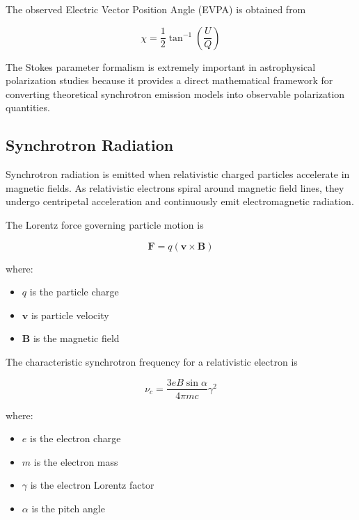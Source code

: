 \documentclass{article}
\begin{document}
The observed Electric Vector Position Angle (EVPA) is obtained from

\begin{equation}
\chi =
\frac{1}{2}
\tan^{-1}\left(\frac{U}{Q}\right)
\end{equation}

The Stokes parameter formalism is extremely important in astrophysical polarization studies because it provides a direct mathematical framework for converting theoretical synchrotron emission models into observable polarization quantities.

\subsection{Synchrotron Radiation}

Synchrotron radiation is emitted when relativistic charged particles accelerate in magnetic fields. As relativistic electrons spiral around magnetic field lines, they undergo centripetal acceleration and continuously emit electromagnetic radiation.

The Lorentz force governing particle motion is

\begin{equation}
\mathbf{F} = q(\mathbf{v}\times\mathbf{B})
\end{equation}

where:
\begin{itemize}
    \item \(q\) is the particle charge
    \item \(\mathbf{v}\) is particle velocity
    \item \(\mathbf{B}\) is the magnetic field
\end{itemize}

The characteristic synchrotron frequency for a relativistic electron is

\begin{equation}
\nu_c =
\frac{3eB\sin\alpha}{4\pi mc}\gamma^2
\end{equation}

where:
\begin{itemize}
    \item \(e\) is the electron charge
    \item \(m\) is the electron mass
    \item \(\gamma\) is the electron Lorentz factor
    \item \(\alpha\) is the pitch angle
\end{itemize}
\end{document}
